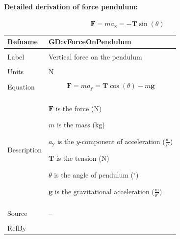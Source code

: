 \documentclass[12pt]{article}
\begin{document}
\paragraph{Detailed derivation of force pendulum:}
\label{GD:hForceOnPendulumDeriv}
\begin{displaymath}
\mathbf{F}=m {a_{\text{x}}}=-\mathbf{T} \sin\left(θ\right)
\end{displaymath}
\vspace{\baselineskip}
\noindent
\begin{minipage}{\textwidth}
\begin{tabular}{>{\raggedright}p{}>{\raggedright\arraybackslash}p{}}
\toprule \textbf{Refname} & \textbf{GD:vForceOnPendulum}
\label{GD:vForceOnPendulum}
\\ \midrule \\
Label & Vertical force on the pendulum
        
\\ \midrule \\
Units & ${\text{N}}$
        
\\ \midrule \\
Equation & \begin{displaymath}
           \mathbf{F}=m {a_{\text{y}}}=\mathbf{T} \cos\left(θ\right)-m \mathbf{g}
           \end{displaymath}
\\ \midrule \\
Description & \begin{symbDescription}
              \item{$\mathbf{F}$ is the force (${\text{N}}$)}
              \item{$m$ is the mass (${\text{kg}}$)}
              \item{${a_{\text{y}}}$ is the $y$-component of acceleration ($\frac{\text{m}}{\text{s}^{2}}$)}
              \item{$\mathbf{T}$ is the tension (${\text{N}}$)}
              \item{$θ$ is the angle of pendulum (${{}^{\circ}}$)}
              \item{$\mathbf{g}$ is the gravitational acceleration ($\frac{\text{m}}{\text{s}^{2}}$)}
              \end{symbDescription}
\\ \midrule \\
Source & --
         
\\ \midrule \\
RefBy & 
\\ \bottomrule
\end{tabular}
\end{minipage}
\end{document}
